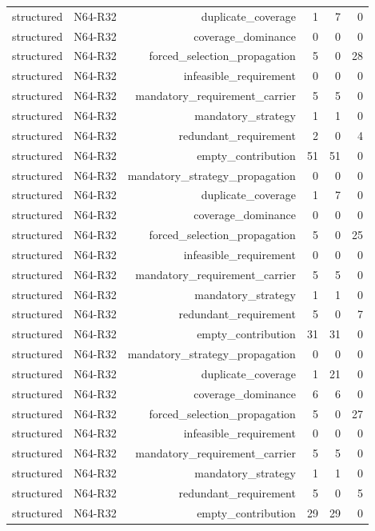 {\begin{longtable}{lrrrrr}
structured & N64-R32 & duplicate\_coverage & 1 & 7 & 0 \\
structured & N64-R32 & coverage\_dominance & 0 & 0 & 0 \\
structured & N64-R32 & forced\_selection\_propagation & 5 & 0 & 28 \\
structured & N64-R32 & infeasible\_requirement & 0 & 0 & 0 \\
structured & N64-R32 & mandatory\_requirement\_carrier & 5 & 5 & 0 \\
structured & N64-R32 & mandatory\_strategy & 1 & 1 & 0 \\
structured & N64-R32 & redundant\_requirement & 2 & 0 & 4 \\
structured & N64-R32 & empty\_contribution & 51 & 51 & 0 \\
structured & N64-R32 & mandatory\_strategy\_propagation & 0 & 0 & 0 \\
structured & N64-R32 & duplicate\_coverage & 1 & 7 & 0 \\
structured & N64-R32 & coverage\_dominance & 0 & 0 & 0 \\
structured & N64-R32 & forced\_selection\_propagation & 5 & 0 & 25 \\
structured & N64-R32 & infeasible\_requirement & 0 & 0 & 0 \\
structured & N64-R32 & mandatory\_requirement\_carrier & 5 & 5 & 0 \\
structured & N64-R32 & mandatory\_strategy & 1 & 1 & 0 \\
structured & N64-R32 & redundant\_requirement & 5 & 0 & 7 \\
structured & N64-R32 & empty\_contribution & 31 & 31 & 0 \\
structured & N64-R32 & mandatory\_strategy\_propagation & 0 & 0 & 0 \\
structured & N64-R32 & duplicate\_coverage & 1 & 21 & 0 \\
structured & N64-R32 & coverage\_dominance & 6 & 6 & 0 \\
structured & N64-R32 & forced\_selection\_propagation & 5 & 0 & 27 \\
structured & N64-R32 & infeasible\_requirement & 0 & 0 & 0 \\
structured & N64-R32 & mandatory\_requirement\_carrier & 5 & 5 & 0 \\
structured & N64-R32 & mandatory\_strategy & 1 & 1 & 0 \\
structured & N64-R32 & redundant\_requirement & 5 & 0 & 5 \\
structured & N64-R32 & empty\_contribution & 29 & 29 & 0 \\

\end{longtable}}
